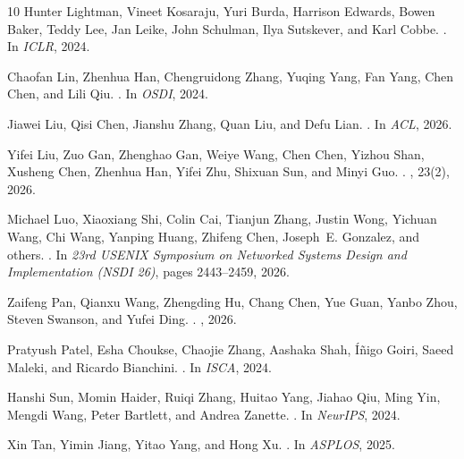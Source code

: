 \begin{thebibliography}{10}
Hunter Lightman, Vineet Kosaraju, Yuri Burda, Harrison Edwards, Bowen Baker,
  Teddy Lee, Jan Leike, John Schulman, Ilya Sutskever, and Karl Cobbe.
.
\newblock In {\em ICLR}, 2024.

Chaofan Lin, Zhenhua Han, Chengruidong Zhang, Yuqing Yang, Fan Yang, Chen Chen,
  and Lili Qiu.
.
\newblock In {\em OSDI}, 2024.

Jiawei Liu, Qisi Chen, Jianshu Zhang, Quan Liu, and Defu Lian.
.
\newblock In {\em ACL}, 2026.

Yifei Liu, Zuo Gan, Zhenghao Gan, Weiye Wang, Chen Chen, Yizhou Shan, Xusheng
  Chen, Zhenhua Han, Yifei Zhu, Shixuan Sun, and Minyi Guo.
.
,
  23(2), 2026.

Michael Luo, Xiaoxiang Shi, Colin Cai, Tianjun Zhang, Justin Wong, Yichuan
  Wang, Chi Wang, Yanping Huang, Zhifeng Chen, Joseph~E. Gonzalez, and others.
.
\newblock In {\em 23rd USENIX Symposium on Networked Systems Design and
  Implementation (NSDI 26)}, pages 2443--2459, 2026.

Zaifeng Pan, Qianxu Wang, Zhengding Hu, Chang Chen, Yue Guan, Yanbo Zhou,
  Steven Swanson, and Yufei Ding.
.
, 2026.

Pratyush Patel, Esha Choukse, Chaojie Zhang, Aashaka Shah, {\'I}{\~n}igo Goiri,
  Saeed Maleki, and Ricardo Bianchini.
.
\newblock In {\em ISCA}, 2024.

Hanshi Sun, Momin Haider, Ruiqi Zhang, Huitao Yang, Jiahao Qiu, Ming Yin,
  Mengdi Wang, Peter Bartlett, and Andrea Zanette.
.
\newblock In {\em NeurIPS}, 2024.

Xin Tan, Yimin Jiang, Yitao Yang, and Hong Xu.
.
\newblock In {\em ASPLOS}, 2025.


\end{thebibliography}
